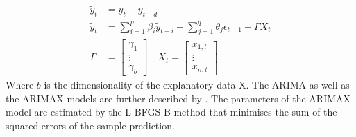 \begin{equation}
\begin{split}
    \tilde{y}_t &= y_t - y_{t-d}\\
    \tilde{y}_t &= \sum\limits_{i=1}^p \beta_i \tilde{y}_{t-i}  + \sum\limits_{j=1}^q \theta_j \epsilon_{t-1} + \Gamma X_t\\
    \Gamma &= \left[\begin{array}{c} \gamma_1 \\ \vdots \\ \gamma_b \end{array}\right] \quad X_t = \left[ \begin{array}{c} x_{1,t}\\ \vdots\\ x_{n,t} \end{array} \right]
\end{split}
\end{equation}
Where $b$ is the dimensionality of the explanatory data X. The ARIMA as well as the ARIMAX models are further described by \cite{Kirchgassner2013IntroductionAnalysis}. The parameters of the ARIMAX model are estimated by the L-BFGS-B method \citep{L-BFGS-B} that minimises the sum of the squared errors of the sample prediction.

